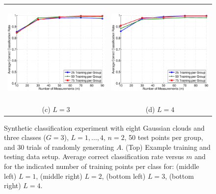 \documentclass[twoside,11pt]{article}
\begin{document}
\begin{figure}[!htbp]
\begin{tabular}{cc}
\includegraphics[height=2in]{images/Synthetic/8ball_g3_d2/synthetic_4d.eps} &
\includegraphics[height=2in]{images/Synthetic/8ball_g3_d2/synthetic_4e.eps} \\
(c) $L=3$ & (d) $L=4$ \\
\end{tabular}
\caption{Synthetic classification experiment with eight Gaussian clouds and three classes ($G=3$), $L=1,\dots,4$, $n=2$, 50 test points per group, and 30 trials of randomly generating $A$. (Top) Example training and testing data setup. Average correct classification rate versus $m$ and for the indicated number of training points per class for: (middle left) $L=1$, (middle right) $L=2$, (bottom left) $L=3$, (bottom right) $L=4$.}
\label{syn:gaussian3 alternating8}
\end{figure}
\end{document}
